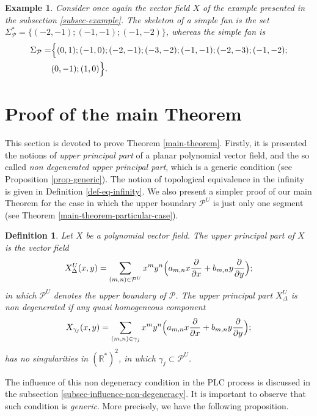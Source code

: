 \documentclass[12pt]{amsart}
\newtheorem{example}[theorem]{Example}
\newtheorem{definition}[theorem]{Definition}
\begin{document}
\begin{example}
Consider once again the vector field $X$ of the example presented in the subsection \ref{subsec-example}. The skeleton of a simple fan is the set $\Sigma^{*}_{\mathcal{P}} = \{(-2,-1); (-1,-1);(-1,-2)\}$, whereas the simple fan is 
\begin{equation*}
\begin{split}
\Sigma_{\mathcal{P}} = & \Big{\{}(0,1); (-1,0); (-2,-1); (-3,-2); (-1,-1);(-2,-3);(-1,-2); \\
& (0,-1);(1,0)\Big{\}}.
\end{split}
\end{equation*}
\end{example}



\section{Proof of the main Theorem}\label{sec-main-theo}

This section is devoted to prove Theorem \ref{main-theorem}. Firstly, it is presented the notions of \emph{upper principal part} of a planar polynomial vector field, and the so called \emph{non degenerated upper principal part}, which is a generic condition (see Proposition \ref{prop-generic}). The notion of topological equivalence in the infinity is given in Definition \ref{def-eq-infinity}. We also present a simpler proof of our main Theorem for the case in which the upper boundary $\mathcal{P}^{U}$ is just only one segment (see Theorem \ref{main-theorem-particular-case}).

\begin{definition}\label{def-upper-degenerated}
Let $X$ be a polynomial vector field. The \emph{upper principal part of $X$} is the vector field
$$X_{\Delta}^{U}(x,y) = \sum_{(m,n)\in\mathcal{P}^{U}} x^{m}y^{n}\Big{(}a_{m,n}x\displaystyle\frac{\partial}{\partial x} + b_{m,n}y\displaystyle\frac{\partial}{\partial y}\Big{)};$$
in which $\mathcal{P}^{U}$ denotes the upper boundary of $\mathcal{P}$. The upper principal part $X_{\Delta}^{U}$ is \emph{non degenerated} if any quasi homogeneous component 
$$X_{\gamma_{j}}(x,y) = \sum_{(m,n)\in\gamma_{j}} x^{m}y^{n}\Big{(}a_{m,n}x\displaystyle\frac{\partial}{\partial x} + b_{m,n}y\displaystyle\frac{\partial}{\partial y}\Big{)};$$
has no singularities in $(\mathbb{R}^{*})^{2}$, in which $\gamma_{j}\subset\mathcal{P}^{U}$. 
\end{definition}

The influence of this non degeneracy condition in the PLC process is discussed in the subsection \ref{subsec-influence-non-degeneracy}. It is important to observe that such condition is \emph{generic}. More precisely, we have the following proposition.
\end{document}
